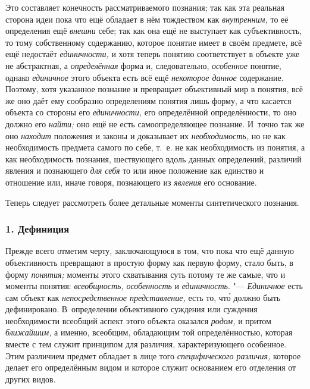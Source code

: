 Это составляет конечность рассматриваемого познания; так как
эта реальная сторона идеи пока что ещё обладает в нём тождеством как
{\em внутренним,} то её
определения ещё {\em внешни}
себе; так как она ещё не выступает как субъективность, то
тому собственному содержанию, которое понятие имеет в своём предмете, всё
ещё недостаёт {\em единичности,}
и хотя теперь понятию соответствует в объекте уже не
абстрактная, а {\em определённая}
форма и, следовательно,
{\em особенное} понятие,
однако {\em единичное}
этого объекта есть всё ещё
{\em некоторое данное}
содержание. Поэтому, хотя указанное познание и превращает
объективный мир в понятия, всё же оно даёт ему сообразно
определениям понятия лишь форму, а что касается объекта со стороны его
{\em единичности,} его
определённой определённости, то оно должно его
{\em найти;} оно ещё не
есть самоопределяющее познание. И~точно так же оно
{\em находит} положения и
законы и доказывает их
{\em необходимость,} но
не как необходимость предмета самого по себе, т.~е. не как необходимость из
понятия, а как необходимость познания, шествующего вдоль данных
определений, различий явления и познающего
{\em для себя} то или
иное положение как единство и отношение или, иначе говоря, познающего из
{\em явления} его
основание.

Теперь следует рассмотреть более детальные моменты синтетического познания.

\subsubsection[1. Дефиниция]{\bfseries 1. Дефиниция}

Прежде всего отметим черту, заключающуюся в том, что пока что
ещё данную объективность превращают в простую форму как первую форму, стало
быть, в форму {\em понятия;}
моменты этого схватывания суть потому те же самые, что и
моменты понятия: {\em всеобщность,}
{\em особенность} и
{\em единичность}. "---
{\em Единичное} есть сам
объект как {\em непосредственное
представление,} есть то, чт\'{о} должно быть дефинировано.
В~определении объективного суждения или суждения необходимости всеобщий
аспект этого объекта оказался
{\em родом,} и притом
{\em ближайшим,} а
именно, всеобщим, обладающим той определённостью, которая вместе с тем
служит принципом для различия, характеризующего особенное. Этим различием
предмет обладает в лице того
{\em специфического различия,}
которое делает его определённым видом и которое служит
основанием его отделения от других видов.

